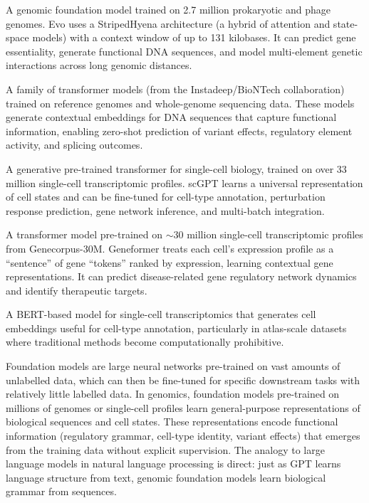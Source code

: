 \begin{description}[style=nextline, itemsep=3pt]
  \item[Evo] A genomic foundation model trained on 2.7 million prokaryotic and phage genomes. Evo uses a StripedHyena architecture (a hybrid of attention and state-space models) with a context window of up to 131 kilobases. It can predict gene essentiality, generate functional DNA sequences, and model multi-element genetic interactions across long genomic distances.

  \item[Nucleotide Transformers] A family of transformer models (from the Instadeep/BioNTech collaboration) trained on reference genomes and whole-genome sequencing data. These models generate contextual embeddings for DNA sequences that capture functional information, enabling zero-shot prediction of variant effects, regulatory element activity, and splicing outcomes.

  \item[scGPT] A generative pre-trained transformer for single-cell biology, trained on over 33 million single-cell transcriptomic profiles. scGPT learns a universal representation of cell states and can be fine-tuned for cell-type annotation, perturbation response prediction, gene network inference, and multi-batch integration.

  \item[Geneformer] A transformer model pre-trained on $\sim$30 million single-cell transcriptomic profiles from Genecorpus-30M. Geneformer treats each cell's expression profile as a ``sentence'' of gene ``tokens'' ranked by expression, learning contextual gene representations. It can predict disease-related gene regulatory network dynamics and identify therapeutic targets.

  \item[scBERT] A BERT-based model for single-cell transcriptomics that generates cell embeddings useful for cell-type annotation, particularly in atlas-scale datasets where traditional methods become computationally prohibitive.
\end{description}

\begin{keyconcept}[title={Foundation Models in Genomics}]
Foundation models are large neural networks pre-trained on vast amounts of unlabelled data, which can then be fine-tuned for specific downstream tasks with relatively little labelled data. In genomics, foundation models pre-trained on millions of genomes or single-cell profiles learn general-purpose representations of biological sequences and cell states. These representations encode functional information (regulatory grammar, cell-type identity, variant effects) that emerges from the training data without explicit supervision. The analogy to large language models in natural language processing is direct: just as GPT learns language structure from text, genomic foundation models learn biological grammar from sequences.
\end{keyconcept}

